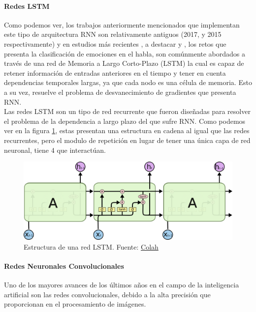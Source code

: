 \documentclass[11pt,a4paper,spanish]{book}
\begin{document}
	\paragraph{Redes LSTM}\hfill \break
	Como podemos ver, los trabajos anteriormente mencionados que implementan este tipo de arquitectura RNN son relativamente antiguos (2017, y 2015 respectivamente) y en estudios más recientes , a destacar \cite{Wang2020} y \cite{Atmaja2019}, los retos que presenta la clasificación de emociones en el habla, son comúnmente abordados a través de una red de Memoria a Largo Corto-Plazo (LSTM) la cual es capaz de retener información de entradas anteriores en el tiempo y tener en cuenta dependencias temporales largas, ya que cada nodo es una célula de memoria. Esto a su vez, resuelve el problema de desvanecimiento de gradientes que presenta RNN.\\
	Las redes LSTM son un tipo de red recurrente que fueron diseñadas para resolver el problema de la dependencia a largo plazo del que sufre RNN. Como podemos ver en la figura \ref{fig:netLSTM}, estas presentan una estructura en cadena al igual que las redes recurrentes, pero el modulo de repetición en lugar de tener una única capa de red neuronal, tiene 4 que interactúan.
	\begin{figure}[H]
		\centering
		\includegraphics[scale=0.25]{LSTM3-chain.png}
		\caption{Estructura de una red LSTM. Fuente: \href{https://colah.github.io/posts/2015-08-Understanding-LSTMs/}{Colah}}
		\label{fig:netLSTM} 
	\end{figure}
	
	\paragraph{Redes Neuronales Convolucionales}\hfill \break
	Uno de los mayores avances de los últimos años en el campo de la inteligencia artificial son las redes convolucionales, debido a la alta precisión que proporcionan en el procesamiento de imágenes.
	
\end{document}
